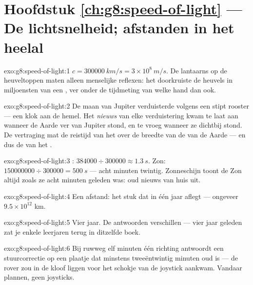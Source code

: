 \section*{Hoofdstuk \ref{ch:g8:speed-of-light} --- De lichtsnelheid; afstanden in het heelal}

\begin{solution}{exo:g8:speed-of-light:1}
$c = \qty{300000}{km/s} = 3 \times 10^{8}\ \unit{m/s}$. De lantaarns op
de heuveltoppen maten alleen menselijke reflexen: het
 doorkruiste de heuvels in miljoensten van een , ver
onder de tijdmeting van welke hand dan ook.
\end{solution}

\begin{solution}{exo:g8:speed-of-light:2}
De maan van Jupiter verduisterde volgens een stipt rooster --- een klok
aan de hemel. Het \emph{nieuws} van elke verduistering kwam te laat aan
wanneer de Aarde ver van Jupiter stond, en te vroeg wanneer ze dichtbij
stond. De vertraging mat de reistijd van het  over de
breedte van de  van de Aarde --- en dus de
 van het .
\end{solution}

\begin{solution}{exo:g8:speed-of-light:3}
: $384000 \div 300000 \approx \qty{1.3}{s}$. Zon:
$150000000 \div 300000 = \qty{500}{s}$ --- acht minuten twintig.
Zonneschijn toont de Zon altijd zoals ze acht minuten geleden was: oud
nieuws van huis uit.
\end{solution}

\begin{solution}{exo:g8:speed-of-light:4}
Een afstand: het stuk dat  in één jaar aflegt --- ongeveer
$9.5 \times 10^{12}$ km.
\end{solution}

\begin{solution}{exo:g8:speed-of-light:5}
Vier jaar. De antwoorden verschillen --- vier jaar geleden zat je
enkele leerjaren terug in ditzelfde boek.
\end{solution}

\begin{solution}{exo:g8:speed-of-light:6}
Bij ruwweg elf minuten één richting antwoordt een stuurcorrectie op een
plaatje dat minstens tweeëntwintig minuten oud is --- de rover zou in
de kloof liggen voor het schokje van de joystick aankwam. Vandaar
plannen, geen joysticks.
\end{solution}

